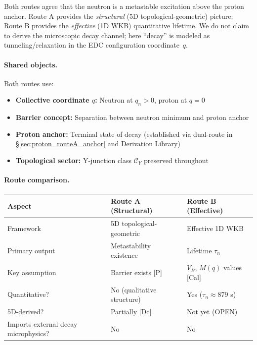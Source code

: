 Both routes agree that the neutron is a metastable excitation above the proton anchor.
Route A provides the \emph{structural} (5D topological-geometric) picture; Route B provides
the \emph{effective} (1D WKB) quantitative lifetime. We do not claim to derive the microscopic
decay channel; here ``decay'' is modeled as tunneling/relaxation in the EDC configuration coordinate~$q$.

\paragraph{Shared objects.}

Both routes use:
\begin{itemize}[nosep]
  \item \textbf{Collective coordinate $q$:} Neutron at $q_n > 0$, proton at $q = 0$
  \item \textbf{Barrier concept:} Separation between neutron minimum and proton anchor
  \item \textbf{Proton anchor:} Terminal state of decay (established via dual-route in
        \S\ref{sec:proton_routeA_anchor} and Derivation Library)
  \item \textbf{Topological sector:} Y-junction class $\mathcal{C}_Y$ preserved throughout
\end{itemize}

\paragraph{Route comparison.}

\begin{center}
\begin{tabular}{lll}
\toprule
\textbf{Aspect} & \textbf{Route A (Structural)} & \textbf{Route B (Effective)} \\
\midrule
Framework & 5D topological-geometric & Effective 1D WKB \\
Primary output & Metastability existence & Lifetime $\tau_n$ \\
Key assumption & Barrier exists [P] & $V_B$, $M(q)$ values [Cal] \\
Quantitative? & No (qualitative structure) & Yes ($\tau_n \approx 879$ s) \\
5D-derived? & Partially [Dc] & Not yet (OPEN) \\
Imports external decay microphysics? & No & No \\
\bottomrule
\end{tabular}
\end{center}

